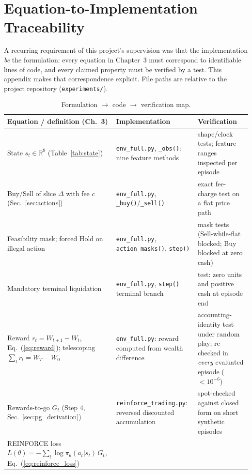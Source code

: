 \chapter{Equation-to-Implementation Traceability}
\label{app:trace}

A recurring requirement of this project's supervision was that the
implementation \emph{be} the formulation: every equation in Chapter~3
must correspond to identifiable lines of code, and every claimed property
must be verified by a test. This appendix makes that correspondence
explicit. File paths are relative to the project repository
(\texttt{experiments/}).

\begin{table}[h]
\centering
\caption{Formulation $\to$ code $\to$ verification map.}
\label{tab:trace}
\small
\begin{tabular}{p{4.6cm} p{4.9cm} p{4.3cm}}
\toprule
\textbf{Equation / definition (Ch.~3)} & \textbf{Implementation} & \textbf{Verification} \\
\midrule
State $s_t \in \mathbb{R}^9$ (Table~\ref{tab:state})
 & \texttt{env\_full.py}, \texttt{\_obs()}: nine feature methods
 & shape/clock tests; feature ranges inspected per episode \\
\addlinespace
Buy/Sell of slice $\Delta$ with fee $c$ (Sec.~\ref{sec:actions})
 & \texttt{env\_full.py}, \texttt{\_buy()}/\texttt{\_sell()}
 & exact fee-charge test on a flat price path \\
\addlinespace
Feasibility mask; forced Hold on illegal action
 & \texttt{env\_full.py}, \texttt{action\_masks()}, \texttt{step()}
 & mask tests (Sell-while-flat blocked; Buy blocked at zero cash) \\
\addlinespace
Mandatory terminal liquidation
 & \texttt{env\_full.py}, \texttt{step()} terminal branch
 & test: zero units and positive cash at episode end \\
\addlinespace
Reward $r_t = W_{t+1} - W_t$, Eq.~(\ref{eq:reward}); telescoping
 $\sum_t r_t = W_T - W_0$
 & \texttt{env\_full.py}: reward computed from wealth difference
 & accounting-identity test under random play; re-checked in
   \emph{every} evaluated episode ($<10^{-6}$) \\
\addlinespace
Rewards-to-go $G_t$ (Step 4, Sec.~\ref{sec:pg_derivation})
 & \texttt{reinforce\_trading.py}: reversed discounted accumulation
 & spot-checked against closed form on short synthetic episodes \\
\addlinespace
REINFORCE loss
 $L(\theta) = -\sum_t \log\pi_\theta(a_t|s_t)\,G_t$,
 Eq.~(\ref{eq:reinforce_loss})

\end{tabular}
\end{table}
